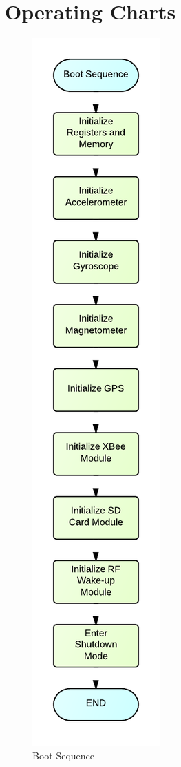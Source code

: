 \section{Operating Charts}

\begin{figure}[H]
	\centering
	\includegraphics[scale=1.0]{img/BootSequenceFlowchart.pdf}
	\caption{Boot Sequence \label{fig:bootSequence}}
\end{figure}

